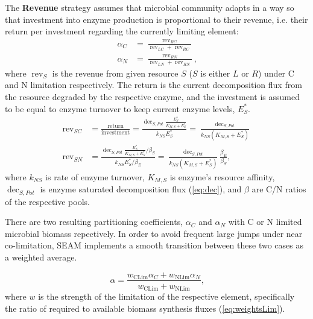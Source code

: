 The \textbf{Revenue} strategy assumes that microbial community adapts in a way
so that investment into enzyme production is proportional to their revenue, i.e.
their return per investment regarding the currently limiting element: 
\begin{subequations}
\label{eq:allocRev}
\begin{align}
\alpha_C &= \frac{\operatorname{rev}_{RC}}{\operatorname{rev}_{LC} + \operatorname{rev}_{RC}} 
\\
\alpha_N &= \frac{\operatorname{rev}_{RN}}{\operatorname{rev}_{LN} + \operatorname{rev}_{RN}} 
\text{,} 
\end{align}
\end{subequations}
where $\operatorname{rev}_S$ is the revenue from given resource $S$ ($S$ is
either $L$ or $R$) under C and N limitation respectively. The return is the
current decomposition flux from the resource degraded by the respective enzyme,
and the investment is assumed to be equal to enzyme turnover to keep current enzyme levels, $E_S^*$.
\begin{subequations}
\label{eq:allocRev2}
\begin{align}
\operatorname{rev}_{SC} &= \frac{\text{return}}{\text{investment}} 
= \frac{\operatorname{dec}_{S,Pot} \frac{E_S^*}{K_{M,S} + E_S^*}} {k_{NS}E_S^*} 
= \frac{\operatorname{dec}_{S,Pot}} {k_{NS}(K_{M,S} + E_S^*)} \\ 
\operatorname{rev}_{SN} &= \frac{\operatorname{dec}_{S,Pot}
\frac{E_S^*}{K_{M,S} + E_S^*} / \beta_S} {k_{NS} E_S^* / \beta_E} 
= \frac{\operatorname{dec}_{S,Pot}}{k_{NS} (K_{M,S} + E_S^*)} 
\frac{\beta_E}{\beta_S}
\text{,} 
\end{align}
\end{subequations}
where $k_{NS}$ is rate of enzyme turnover, $K_{M,S}$ is enzyme's resource
affinity, $\operatorname{dec}_{S,Pot}$ is
enzyme saturated decomposition flux (\ref{eq:dec}), and $\beta$ are C/N ratios
of the respective pools.

There are two resulting partitioning coefficients, $\alpha_C$ and $\alpha_N$
with C or N limited microbial biomass repectively. In order to avoid frequent large jumps
under near co-limitation, SEAM implements a smooth transition between these two
cases as a weighted average.

\begin{equation}
\label{eq:allocRev3}
\alpha = \frac{w_{\operatorname{CLim}} \alpha_C + w_{\operatorname{NLim}}
\alpha_N}{w_{\operatorname{CLim}}  + w_{\operatorname{NLim}} } 
\text{,} 
\end{equation}
where $w$ is the strength of the limitation of the respective element,
specifically the ratio of required to available biomass synthesis fluxes
(\ref{eq:weightsLim}).


